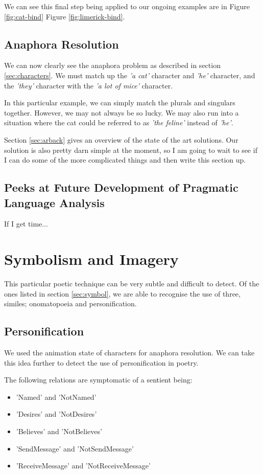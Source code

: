 We can see this final step being applied to our ongoing examples are in Figure \ref{fig:cat-bind} Figure \ref{fig:limerick-bind}.


\subsection{Anaphora Resolution}
\label{sec:ar}
We can now clearly see the anaphora problem as described in section \ref{sec:characters}. We must match up the \textit{'a cat'} character and \textit{'he'} character, and the \textit{'they'} character with the \textit{'a lot of mice'} character. 

In this particular example, we can simply match the plurals and singulars together. However, we may not always be so lucky. We may also run into a situation where the cat could be referred to as \textit{'the feline'} instead of \textit{'he'}.

Section \ref{sec:arback} gives an overview of the state of the art solutions. Our solution is also pretty darn simple at the moment, so I am going to wait to see if I can do some of the more complicated things and then write this section up.


\subsection{Peeks at Future Development of Pragmatic Language Analysis}

If I get time...


\section{Symbolism and Imagery}

This particular poetic technique can be very subtle and difficult to detect. Of the ones listed in section \ref{sec:symbol}, we are able to recognise the use of three, similes; onomatopoeia and personification.

\subsection{Personification}

We used the animation state of characters for anaphora resolution. We can take this idea further to detect the use of personification in poetry.

The following relations are symptomatic of a sentient being:

\begin{itemize}
\item{'Named' and 'NotNamed'}
\item{'Desires' and 'NotDesires'}
\item{'Believes' and 'NotBelieves'}
\item{'SendMessage' and 'NotSendMessage'}
\item{'ReceiveMessage' and 'NotReceiveMessage'}
\end{itemize}

